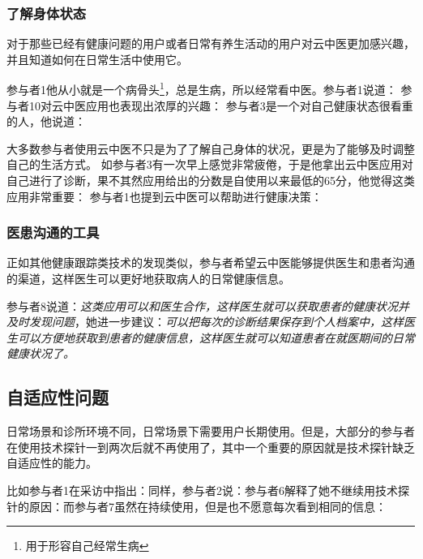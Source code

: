 \subsubsection{了解身体状态}

对于那些已经有健康问题的用户或者日常有养生活动的用户对云中医更加感兴趣，并且知道如何在日常生活中使用它。

参与者1他从小就是一个病骨头\footnote{用于形容自己经常生病}，总是生病，所以经常看中医。参与者1说道：
参与者10对云中医应用也表现出浓厚的兴趣：
参与者3是一个对自己健康状态很看重的人，他说道：

大多数参与者使用云中医不只是为了了解自己身体的状况，更是为了能够及时调整自己的生活方式。
如参与者3有一次早上感觉非常疲倦，于是他拿出云中医应用对自己进行了诊断，果不其然应用给出的分数是自使用以来最低的65分，他觉得这类应用非常重要：
参与者1也提到云中医可以帮助进行健康决策：

\subsubsection{医患沟通的工具}

正如其他健康跟踪类技术的发现类似，参与者希望云中医能够提供医生和患者沟通的渠道，这样医生可以更好地获取病人的日常健康信息。

参与者8说道：\textit{这类应用可以和医生合作，这样医生就可以获取患者的健康状况并及时发现问题}，她进一步建议：\textit{可以把每次的诊断结果保存到个人档案中，这样医生可以方便地获取到患者的健康信息，这样医生就可以知道患者在就医期间的日常健康状况了。}


\subsection{自适应性问题}

日常场景和诊所环境不同，日常场景下需要用户长期使用。但是，大部分的参与者在使用技术探针一到两次后就不再使用了，其中一个重要的原因就是技术探针缺乏自适应性的能力。

比如参与者1在采访中指出：同样，参与者2说：参与者6解释了她不继续用技术探针的原因：而参与者7虽然在持续使用，但是也不愿意每次看到相同的信息：

